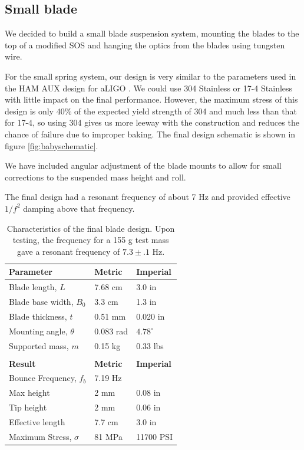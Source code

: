 \subsection{Small blade}
%
We decided to build a small blade suspension system, mounting the blades to the top of a modified SOS and hanging the optics from the blades using tungsten wire.

For the small spring system, our design is very similar to the parameters used in the HAM AUX design for aLIGO \cite{T1000339}.  
We could use 304 Stainless or 17-4 Stainless with little impact on the final performance.  
However, the maximum stress of this design is only 40\% of the expected yield strength of 304 and much less than that for 17-4, so using 304 gives us more leeway with the construction and reduces the chance of failure due to improper baking.  
The final design schematic is shown in figure \ref{fig:babyschematic}.  

We have included angular adjustment of the blade mounts to allow for small corrections to the suspended mass height and roll.

The final design had a resonant frequency of about 7 Hz and provided effective $1/f^2$ damping above that frequency.

\begin{table}[ht]
\centering
\begin{tabular}{ l | l | l }
\bf{Parameter}& \bf{Metric} & \bf{Imperial} \\ \hline
Blade length, $L$ & 7.68 cm & 3.0 in \\ \hline
Blade base width, $B_0$ & 3.3 cm & 1.3 in \\ \hline
Blade thickness, $t$ & 0.51 mm & 0.020 in \\ \hline
Mounting angle, $\theta$ & 0.083 rad & $4.78^\circ$ \\ \hline
Supported mass, $m$ & 0.15 kg & 0.33 lbs\\\\
\bf{Result} & \bf{Metric} & \bf{Imperial} \\ \hline
Bounce Frequency, $f_b$ & 7.19 Hz \\ \hline
Max height & 2 mm & 0.08 in \\ \hline
Tip height & 2 mm & 0.06 in \\ \hline
Effective length & 7.7 cm & 3.0 in \\ \hline
Maximum Stress, $\sigma$ & 81 MPa & 11700 PSI
\end{tabular}
\caption{Characteristics of the final blade design. Upon testing, the frequency for a 155 g test mass gave a resonant frequency of $7.3 \pm .1$ Hz.}
\label{tab:resultsBaby}
\end{table}

